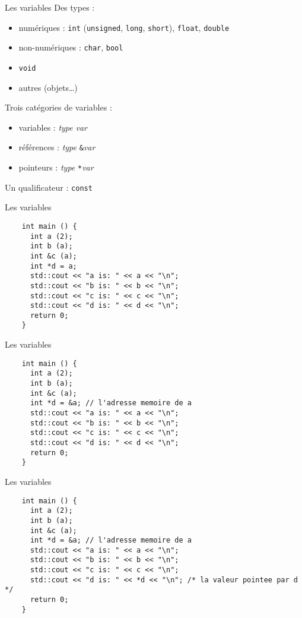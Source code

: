 \begin{frame}{Les variables}
  Des types :
  \begin{itemize}
  \item numériques : \texttt{int} (\texttt{unsigned}, \texttt{long}, \texttt{short}), \texttt{float}, \texttt{double}
  \item non-numériques : \texttt{char}, \texttt{bool}
  \item \texttt{void}
  \item autres (objets\dots{})
  \end{itemize}

  Trois catégories de variables :
  \begin{itemize}
  \item variables : \textit{type} \textit{var}
  \item références : \textit{type} \texttt{\&}\textit{var}
  \item pointeurs : \textit{type} \texttt{*}\textit{var}
  \end{itemize}

  Un qualificateur : \texttt{const}
\end{frame}

\begin{frame}[fragile]{Les variables}
  \begin{lstlisting}
    int main () {
      int a (2);
      int b (a);
      int &c (a);
      int *d = a;
      std::cout << "a is: " << a << "\n";
      std::cout << "b is: " << b << "\n";
      std::cout << "c is: " << c << "\n";
      std::cout << "d is: " << d << "\n";
      return 0;
    }
  \end{lstlisting}
\end{frame}

\begin{frame}[fragile]{Les variables}
  \begin{lstlisting}
    int main () {
      int a (2);
      int b (a);
      int &c (a);
      int *d = &a; // l'adresse memoire de a
      std::cout << "a is: " << a << "\n";
      std::cout << "b is: " << b << "\n";
      std::cout << "c is: " << c << "\n";
      std::cout << "d is: " << d << "\n";
      return 0;
    }
  \end{lstlisting}
\end{frame}

\begin{frame}[fragile]{Les variables}
  \begin{lstlisting}
    int main () {
      int a (2);
      int b (a);
      int &c (a);
      int *d = &a; // l'adresse memoire de a
      std::cout << "a is: " << a << "\n";
      std::cout << "b is: " << b << "\n";
      std::cout << "c is: " << c << "\n";
      std::cout << "d is: " << *d << "\n"; /* la valeur pointee par d */
      return 0;
    }
  \end{lstlisting}
\end{frame}

